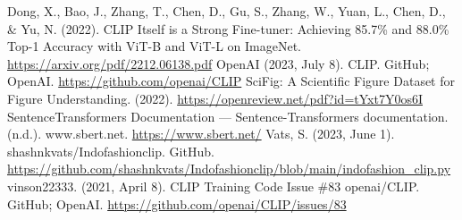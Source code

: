 \documentclass[letterpaper, 10 pt, conference]{ieeeconf}  %
\begin{document}
\begin{thebibliography}{99}
 Dong, X., Bao, J., Zhang, T., Chen, D., Gu, S., Zhang, W., Yuan, L., Chen, D., \& Yu, N. 
(2022). CLIP Itself is a Strong Fine-tuner: Achieving 85.7\% and 88.0\% Top-1 Accuracy with ViT-B and ViT-L 
on ImageNet. \url{https://arxiv.org/pdf/2212.06138.pdf}
 OpenAI (2023, July 8). CLIP. GitHub; OpenAI. \url{https://github.com/openai/CLIP}
 SciFig: A Scientific Figure Dataset for Figure Understanding. (2022). 
\url{https://openreview.net/pdf?id=tYxt7Y0os6I}
 SentenceTransformers Documentation — Sentence-Transformers documentation. (n.d.). 
www.sbert.net. \url{https://www.sbert.net/}
 Vats, S. (2023, June 1).  shashnkvats/Indofashionclip. GitHub. 
\url{https://github.com/shashnkvats/Indofashionclip/blob/main/indofashion_clip.py}
  vinson22333. (2021, April 8). CLIP Training Code Issue \#83 openai/CLIP. GitHub; OpenAI. 
\url{https://github.com/openai/CLIP/issues/83}
\end{thebibliography}
\end{document}
